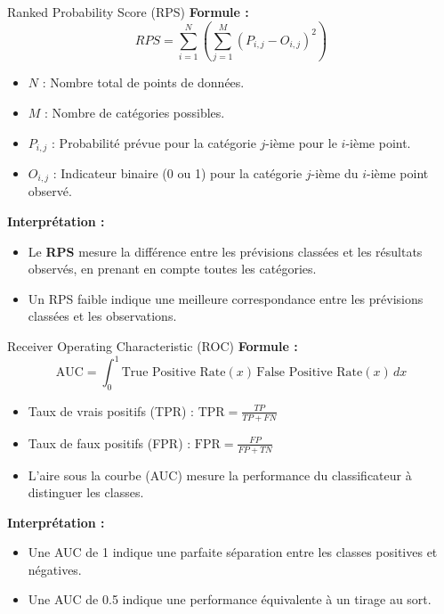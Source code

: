 \begin{frame}{Ranked Probability Score (RPS)}
  \textbf{Formule :}
  \[
  RPS = \sum_{i=1}^N \left( \sum_{j=1}^M (P_{i,j} - O_{i,j})^2 \right)
  \]
  \begin{itemize}
  \item \( N \) : Nombre total de points de données.
  \item \( M \) : Nombre de catégories possibles.
  \item \( P_{i,j} \) : Probabilité prévue pour la catégorie \(j\)-ième pour le \(i\)-ième point.
  \item \( O_{i,j} \) : Indicateur binaire (0 ou 1) pour la catégorie \(j\)-ième du \(i\)-ième point observé.
  \end{itemize}
  
  \textbf{Interprétation :}
  \begin{itemize}
      \item Le \textbf{RPS} mesure la différence entre les prévisions classées et les résultats observés, en prenant en compte toutes les catégories.
      \item Un RPS faible indique une meilleure correspondance entre les prévisions classées et les observations.
  \end{itemize}
\end{frame}
\begin{frame}{Receiver Operating Characteristic (ROC)}
  \textbf{Formule :}
  \[
  \text{AUC} = \int_0^1 \text{True Positive Rate}(x) \, \text{False Positive Rate}(x) \, dx
  \]
  \begin{itemize}
  \item Taux de vrais positifs (TPR) : \( \text{TPR} = \frac{TP}{TP + FN} \)
  \item Taux de faux positifs (FPR) : \( \text{FPR} = \frac{FP}{FP + TN} \)
  \item L'aire sous la courbe (AUC) mesure la performance du classificateur à distinguer les classes.
  \end{itemize}
  
  \textbf{Interprétation :}
  \begin{itemize}
      \item Une AUC de 1 indique une parfaite séparation entre les classes positives et négatives.
      \item Une AUC de 0.5 indique une performance équivalente à un tirage au sort.
  \end{itemize}
\end{frame}
